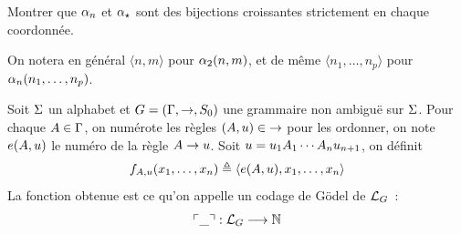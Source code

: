 \begin{exercise}
  Montrer que $\alpha_{n}$ et $\alpha_{\star}$ sont des bijections croissantes strictement
  en chaque coordonnée.
\end{exercise}

\begin{notation}
  On notera en général $\langle n,m\rangle$ pour $\alpha_{2}(n,m)$, et de même
  $\langle n_1,\ldots,n_p\rangle$ pour $\alpha_{n}(n_1,\ldots,n_p)$.
\end{notation}

\begin{definition}
  Soit $\Sigma$ un alphabet et $G=(\Gamma,\to,S_{0})$ une grammaire non ambiguë
  sur $\Sigma$. Pour chaque $A \in \Gamma$, on numérote les règles
  $(A,u) \in \mathord{\to}$ pour les ordonner, on note $e(A,u)$
  le numéro de la règle $A\to u$. Soit
  $u = u_1A_1\cdots A_nu_{n+1}$, on définit
  \[f_{A,u}(x_1,\ldots,x_n)\triangleq
  \langle e(A,u),x_1,\ldots,x_n\rangle\]
  La fonction obtenue est ce qu'on appelle un codage de Gödel de
  $\mathcal L_{G}$~:
  \[\ulcorner\mathord{\_}\urcorner : \displaystyle \mathcal L_{G} \longrightarrow \mathbb N\]
  \index[notation]{$\godcod{\varFF}$}
\end{definition}

